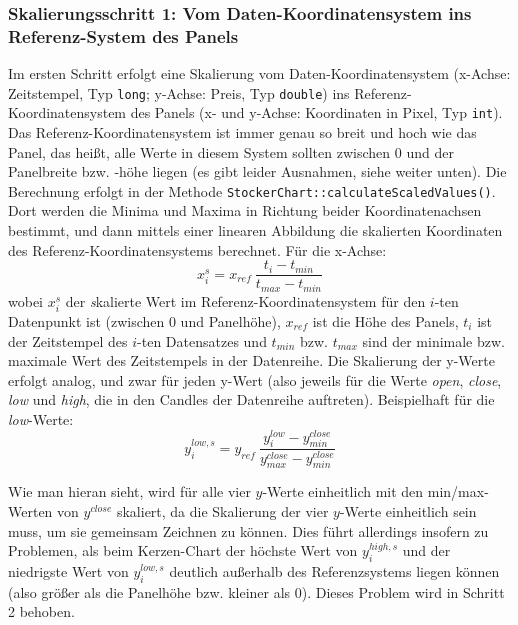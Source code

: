 \documentclass[fontsize=12pt, paper=a4, pagesize=auto, twoside=false, DIV=11, draft=false]{scrartcl}
\begin{document}
\subsubsection{Skalierungsschritt 1: Vom Daten-Koordinatensystem ins Referenz-System des Panels}
Im ersten Schritt erfolgt eine Skalierung vom Daten-Koordinatensystem (x-Achse: Zeitstempel, Typ \texttt{long}; y-Achse: Preis, Typ \texttt{double}) ins Referenz-Ko\-or\-di\-na\-ten\-sys\-tem des Panels (x- und y-Achse: Koordinaten in Pixel, Typ \texttt{int}). Das Referenz-Koordinatensystem ist immer genau so breit und hoch wie das Panel, das heißt, alle Werte in diesem System sollten zwischen 0 und der Panelbreite bzw. -höhe liegen (es gibt leider Ausnahmen, siehe weiter unten). Die Berechnung erfolgt in der Methode \texttt{Stocker\-Chart::cal\-cu\-late\-Scaled\-Values()}. Dort werden die Minima und Maxima in Richtung beider Koordinatenachsen bestimmt, und dann mittels einer linearen Abbildung die skalierten Koordinaten des Referenz-Koordinatensystems berechnet. Für die x-Achse: 
\begin{equation} \label{eq:xscale_1}
x^s_i = x_{ref} ~\frac{t_i - t_{min}}{t_{max} - t_{min}}
\end{equation}
wobei $x^s_i$ der \textit{s}kalierte Wert im Referenz-Koordinatensystem für den $i$-ten Datenpunkt ist (zwischen 0 und Panelhöhe), $x_{ref}$ ist die Höhe des Panels, $t_i$ ist der Zeitstempel des $i$-ten Datensatzes und $t_{min}$ bzw. $t_{max}$ sind der minimale bzw. maximale Wert des Zeitstempels in der Datenreihe. Die Skalierung der y-Werte erfolgt analog, und zwar für jeden y-Wert (also jeweils für die Werte \textit{open}, \textit{close}, \textit{low} und \textit{high}, die in den Candles der Datenreihe auftreten). Beispielhaft für die \textit{low}-Werte:
\begin{equation} \label{eq:yscale_1}
y^{low,s}_i = y_{ref} ~\frac{y^{low}_i - y^{close}_{min}}{y^{close}_{max} - y^{close}_{min}}
\end{equation}

Wie man hieran sieht, wird für alle vier $y$-Werte einheitlich mit den min/max-Werten von $y^{close}$ skaliert, da die Skalierung der vier $y$-Werte einheitlich sein muss, um sie gemeinsam Zeichnen zu können. Dies führt allerdings insofern zu Problemen, als beim Kerzen-Chart der höchste Wert von $y^{high,s}_i$ und der niedrigste Wert von $y^{low,s}_i$ deutlich außerhalb des Referenzsystems liegen können (also größer als die Panelhöhe bzw. kleiner als 0). Dieses Problem wird in Schritt 2 behoben.
\end{document}
